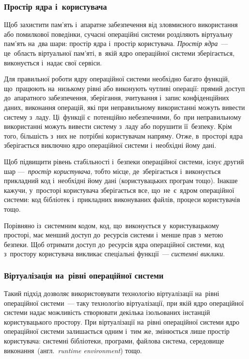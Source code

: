 \documentclass[
	a4paper,
	oneside,
	BCOR = 10mm,
	DIV = 12,
	12pt,
	headings = normal,
]{scrartcl}
\newcommand{\transeng}[1]{{англ.}~\textit{\textenglish{#1}}}
\begin{document}
			\subsubsection{Простір ядра і~користувача}
				Щоб захистити пам'ять і~апаратне забезпечення від зловмисного використання або помилкової поведінки, сучасні операційні системи розділяють віртуальну пам'ять на~два шари: простір ядра і~простір користувача. \emph{Простір ядра}~— це~область віртуальної пам'яті, в~якій ядро операційної системи зберігається, виконується і~надає свої сервіси.

				Для правильної роботи ядру операційної системи необхідно багато функцій, що~працюють на~низькому рівні або виконують чутливі операції: прямий доступ до~апаратного забезпечення, зберігання, зчитування і~запис конфіденційних даних, виконання операцій, які при неправильному використанні можуть вивести систему з~ладу. Ці~функції є~потенційно небезпечними, бо~при неправильному використанні можуть вивести систему з~ладу або порушити її~безпеку. Крім того, більшість з~них не~потрібні користувачам напряму. Отже, в~просторі ядра зберігається виключно ядро операційної системи і~необхідні йому дані.

				Щоб підвищити рівень стабільності і~безпеки операційної системи, існує другий шар — \emph{простір користувача}, тобто місце, де~зберігається і~виконується прикладний код і~необхідні йому дані (користувацьких програм тощо). Інакше кажучи, у~просторі користувача зберігається все, що~не~є~ядром операційної системи: код бібліотек і~прикладних виконуваних файлів, процеси користувачів тощо.
				
				Порівняно із~системним кодом, код, що~виконується у~користувацькому просторі, має менший доступ до~ресурсів системи і~менше прав з~метою безпеки. Щоб отримати доступ до~ресурсів ядра операційної системи, код з~простору користувача викликає спеціальні функції~— \emph{системні виклики}.
			
			\subsubsection{Віртуалізація на~рівні операційної системи}
				Такий підхід дозволяє використовувати технологію віртуалізації на~рівні операційної системи~— таку технологію віртуалізації, при якій ядро операційної системи надає можливість створювати декілька ізольованих інстанцій користувацького простору. При віртуалізації на~рівні операційної системи ядро операційної системи залишається одним і~тим же, змінюється лише простір користувача: системні бібліотеки, програми, файлова система, середовище виконання~(\transeng{runtime environment}) тощо.
\end{document}
